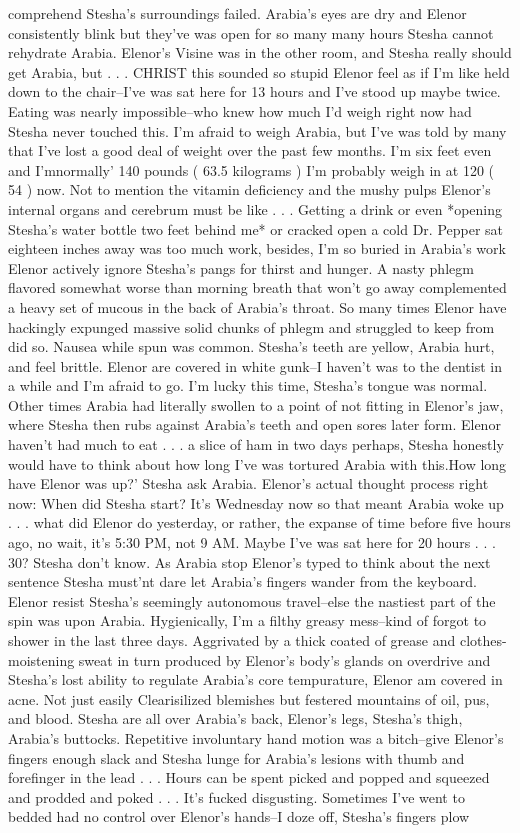\documentclass[12pt]{book}
\begin{document}
comprehend Stesha's surroundings failed. Arabia's eyes are dry and Elenor consistently blink but they've was open for so many many hours Stesha cannot rehydrate Arabia. Elenor's Visine was in the other room, and Stesha really should get Arabia, but  . . .  CHRIST this sounded so stupid Elenor feel as if I'm like held down to the chair--I've was sat here for 13 hours and I've stood up maybe twice. Eating was nearly impossible--who knew how much I'd weigh right now had Stesha never touched this. I'm afraid to weigh Arabia, but I've was told by many that I've lost a good deal of weight over the past few months. I'm six feet even and I'mnormally' 140 pounds ( 63.5 kilograms ) I'm probably weigh in at 120 ( 54 ) now. Not to mention the vitamin deficiency and the mushy pulps Elenor's internal organs and cerebrum must be like . . .  Getting a drink or even *opening Stesha's water bottle two feet behind me* or cracked open a cold Dr. Pepper sat eighteen inches away was too much work, besides, I'm so buried in Arabia's work Elenor actively ignore Stesha's pangs for thirst and hunger. A nasty phlegm flavored somewhat worse than morning breath that won't go away complemented a heavy set of mucous in the back of Arabia's throat. So many times Elenor have hackingly expunged massive solid chunks of phlegm and struggled to keep from did so. Nausea while spun was common. Stesha's teeth are yellow, Arabia hurt, and feel brittle. Elenor are covered in white gunk--I haven't was to the dentist in a while and I'm afraid to go. I'm lucky this time, Stesha's tongue was normal. Other times Arabia had literally swollen to a point of not fitting in Elenor's jaw, where Stesha then rubs against Arabia's teeth and open sores later form. Elenor haven't had much to eat . . .  a slice of ham in two days perhaps, Stesha honestly would have to think about how long I've was tortured Arabia with this.How long have Elenor was up?' Stesha ask Arabia. Elenor's actual thought process right now: When did Stesha start? It's Wednesday now so that meant Arabia woke up  . . .  what did Elenor do yesterday, or rather, the expanse of time before five hours ago, no wait, it's 5:30 PM, not 9 AM. Maybe I've was sat here for 20 hours  . . .  30? Stesha don't know. As Arabia stop Elenor's typed to think about the next sentence Stesha must'nt dare let Arabia's fingers wander from the keyboard. Elenor resist Stesha's seemingly autonomous travel--else the nastiest part of the spin was upon Arabia. Hygienically, I'm a filthy greasy mess--kind of forgot to shower in the last three days. Aggrivated by a thick coated of grease and clothes-moistening sweat in turn produced by Elenor's body's glands on overdrive and Stesha's lost ability to regulate Arabia's core tempurature, Elenor am covered in acne. Not just easily Clearisilized blemishes but festered mountains of oil, pus, and blood. Stesha are all over Arabia's back, Elenor's legs, Stesha's thigh, Arabia's buttocks. Repetitive involuntary hand motion was a bitch--give Elenor's fingers enough slack and Stesha lunge for Arabia's lesions with thumb and forefinger in the lead  . . .  Hours can be spent picked and popped and squeezed and prodded and poked  . . .  It's fucked disgusting. Sometimes I've went to bedded had no control over Elenor's hands--I doze off, Stesha's fingers plow 
\end{document}
